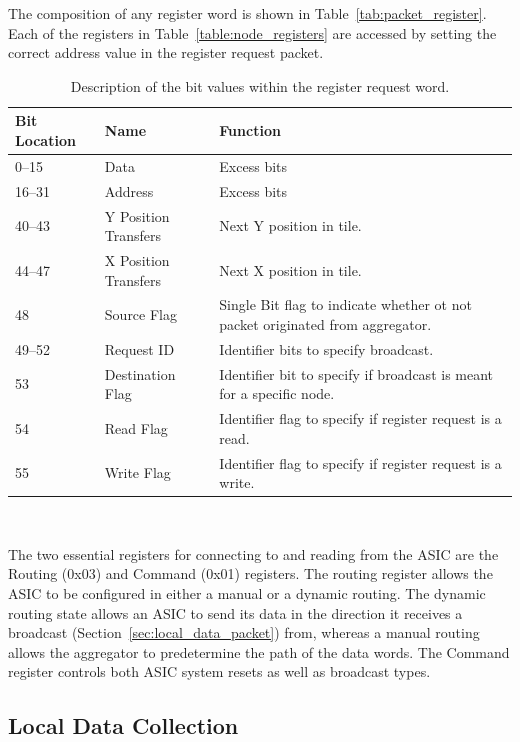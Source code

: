 The composition of any register word is shown in Table~\ref{tab:packet_register}.
Each of the registers in Table~\ref{table:node_registers} are accessed by setting the correct address value in the register request packet.
\begin{table}
\begin{center}
\begin{tabular}{|| p{30mm} | p{30mm} | p{90mm} ||}
 \hline
 Bit Location & Name & Function \\ [0.5ex]
 \hline\hline
  0--15 & Data & Excess bits  \\
 \hline
  16--31 & Address & Excess bits  \\
 \hline
  40--43 & Y Position Transfers & Next Y position in tile. \\
 \hline
  44--47 & X Position Transfers & Next X position in tile. \\
 \hline
  48 & Source Flag & Single Bit flag to indicate whether ot not packet originated from aggregator. \\
 \hline
  49--52 & Request ID & Identifier bits to specify broadcast. \\
 \hline
  53 & Destination Flag & Identifier bit to specify if broadcast is meant for a specific node. \\
 \hline
  54 & Read Flag & Identifier flag to specify if register request is a read. \\
 \hline
  55 & Write Flag & Identifier flag to specify if register request is a write. \\
 \hline
\end{tabular}
\caption{Description of the bit values within the register request word.}
\end{center}
\end{table}~\label{tab:packet_register}

The two essential registers for connecting to and reading from the ASIC are the Routing (0x03) and Command (0x01) registers.
The routing register allows the ASIC to be configured in either a manual or a dynamic routing.
The dynamic routing state allows an ASIC to send its data in the direction it receives a broadcast (Section~\ref{sec:local_data_packet}) from, whereas a manual routing allows the aggregator to predetermine the path of the data words.
The Command register controls both ASIC system resets as well as broadcast types.

\subsection{Local Data Collection}~\label{sec:data_collection}

